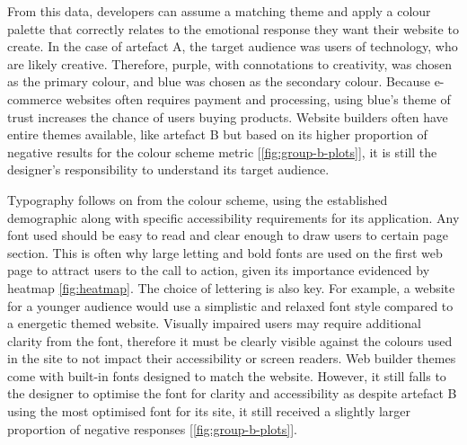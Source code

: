\documentclass[article]{IEEEtran}
\begin{document}
            From this data, developers can assume a matching theme and apply a colour palette that correctly relates to the emotional response they want their website to create. In the case of artefact A, the target audience was users of technology, who are likely creative. Therefore, purple, with connotations to creativity, was chosen as the primary colour, and blue was chosen as the secondary colour. Because e-commerce websites often requires payment and processing, using blue's theme of trust increases the chance of users buying products. Website builders often have entire themes available, like artefact B but based on its higher proportion of negative results for the colour scheme metric [\autoref{fig:group-b-plots}], it is still the designer's responsibility to understand its target audience.

            Typography follows on from the colour scheme, using the established demographic along with specific accessibility requirements for its application. Any font used should be easy to read and clear enough to draw users to certain page section. This is often why large letting and bold fonts are used on the first web page to attract users to the call to action, given its importance evidenced by heatmap \autoref{fig:heatmap}. The choice of lettering is also key. For example, a website for a younger audience would use a simplistic and relaxed font style compared to a energetic themed website. Visually impaired users may require additional clarity from the font, therefore it must be clearly visible against the colours used in the site to not impact their accessibility or screen readers. Web builder themes come with built-in fonts designed to match the website. However, it still falls to the designer to optimise the font for clarity and accessibility as despite artefact B using the most optimised font for its site, it still received a slightly larger proportion of negative responses [\autoref{fig:group-b-plots}]. \\
\end{document}

